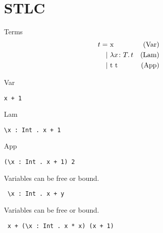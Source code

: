 \documentclass[aspectration=169]{beamer}
\begin{document}
\section{STLC}

\begin{frame}[c]
  Terms
  \begin{displaymath}
    \begin{aligned}
t =& \ \text{x} & \text{(Var)}\\
  |& \ \lambda x \colon T \ldotp t & \text{(Lam)}\\
  |& \ \text{t t} & \text{(App)}
    \end{aligned}
  \end{displaymath}
\end{frame}

\begin{frame}[fragile]
  \begin{center}
   Var
  \end{center}
  \begin{verbatim}
x + 1
  \end{verbatim}  
\end{frame}

\begin{frame}[fragile]
  \begin{center}
   Lam
  \end{center}
  \begin{verbatim}
\x : Int . x + 1
  \end{verbatim}  
\end{frame}

\begin{frame}[fragile]
  \begin{center}
   App
  \end{center}
  \begin{verbatim}
(\x : Int . x + 1) 2
  \end{verbatim}  
\end{frame}

\begin{frame}[fragile]
  \begin{center}
   Variables can be free or bound.
  \end{center}
  \begin{verbatim}
 \x : Int . x + y
  \end{verbatim}  
\end{frame}

\begin{frame}[fragile]
  \begin{center}
   Variables can be free or bound.
  \end{center}
  \begin{verbatim}
 x + (\x : Int . x * x) (x + 1)
  \end{verbatim}  
\end{frame}
\end{document}
